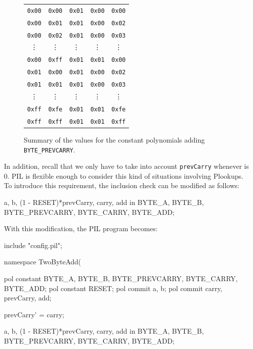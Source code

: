 \begin{figure}[h!]
\begin{tabular}{|c|c|c|c|c|}
\texttt{0x00}		&\texttt{0x00}		&\texttt{0x01}				&\texttt{0x00}			&\texttt{0x00}		  \\
\texttt{0x00}		&\texttt{0x01}		&\texttt{0x01}				&\texttt{0x00}			&\texttt{0x02}		  \\
\texttt{0x00}		&\texttt{0x02}		&\texttt{0x01}				&\texttt{0x00}			&\texttt{0x03}		  \\
\vdots				&\vdots				&\vdots						&\vdots					&\vdots		         \\	
\texttt{0x00}		&\texttt{0xff}		&\texttt{0x01}				&\texttt{0x01}			&\texttt{0x00}		  \\
\texttt{0x01}		&\texttt{0x00}		&\texttt{0x01}				&\texttt{0x00}			&\texttt{0x02}		  \\
\texttt{0x01}		&\texttt{0x01}		&\texttt{0x01}				&\texttt{0x00}			&\texttt{0x03}		  \\
\vdots				&\vdots				&\vdots						&\vdots					&\vdots				  \\
\texttt{0xff}		&\texttt{0xfe}		&\texttt{0x01}				&\texttt{0x01}			&\texttt{0xfe}		  \\
\texttt{0xff}		&\texttt{0xff}		&\texttt{0x01}				&\texttt{0x01}			&\texttt{0xff}		  \\
\hline
\end{tabular}
\caption{Summary of the values for the constant polynomials adding \texttt{BYTE\_PREVCARRY}.}
\label{table:2-bytes-sum-const-prevcarry}
\end{figure}


In addition, recall that we only have to take into account \texttt{prevCarry} whenever \RESET is $0$. PIL is flexible enough to consider this kind of situations involving Plookups. To introduce this requirement, the inclusion check can be modified as follows:
\begin{pil}
{a, b, (1 - RESET)*prevCarry, carry, add} in {BYTE_A, BYTE_B, BYTE_PREVCARRY, BYTE_CARRY, BYTE_ADD};
\end{pil}

With this modification, the PIL program becomes:
\begin{pil}
include "config.pil";

namespace TwoByteAdd(%

    pol constant BYTE_A, BYTE_B, BYTE_PREVCARRY, BYTE_CARRY, BYTE_ADD;
    pol constant RESET;
    pol commit a, b;
    pol commit carry, prevCarry, add;

    prevCarry' = carry;

    {a, b, (1 - RESET)*prevCarry, carry, add} in {BYTE_A, BYTE_B, BYTE_PREVCARRY, BYTE_CARRY, BYTE_ADD};
\end{pil}


